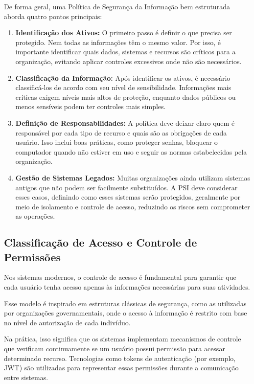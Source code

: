 \documentclass[12pt,a4paper,twoside]{report}
\begin{document}
De forma geral, uma Política de Segurança da Informação bem estruturada aborda quatro pontos principais:

\begin{enumerate}
    \item \textbf{Identificação dos Ativos:} O primeiro passo é definir o que precisa ser protegido. Nem todas as informações têm o mesmo valor. Por isso, é importante identificar quais dados, sistemas e recursos são críticos para a organização, evitando aplicar controles excessivos onde não são necessários.

    \item \textbf{Classificação da Informação:} Após identificar os ativos, é necessário classificá-los de acordo com seu nível de sensibilidade. Informações mais críticas exigem níveis mais altos de proteção, enquanto dados públicos ou menos sensíveis podem ter controles mais simples.

    \item \textbf{Definição de Responsabilidades:} A política deve deixar claro quem é responsável por cada tipo de recurso e quais são as obrigações de cada usuário. Isso inclui boas práticas, como proteger senhas, bloquear o computador quando não estiver em uso e seguir as normas estabelecidas pela organização.

    \item \textbf{Gestão de Sistemas Legados:} Muitas organizações ainda utilizam sistemas antigos que não podem ser facilmente substituídos. A PSI deve considerar esses casos, definindo como esses sistemas serão protegidos, geralmente por meio de isolamento e controle de acesso, reduzindo os riscos sem comprometer as operações.
\end{enumerate}

\subsection{Classificação de Acesso e Controle de Permissões}

Nos sistemas modernos, o controle de acesso é fundamental para garantir que cada usuário tenha acesso apenas às informações necessárias para suas atividades.

Esse modelo é inspirado em estruturas clássicas de segurança, como as utilizadas por organizações governamentais, onde o acesso à informação é restrito com base no nível de autorização de cada indivíduo.

Na prática, isso significa que os sistemas implementam mecanismos de controle que verificam continuamente se um usuário possui permissão para acessar determinado recurso. Tecnologias como tokens de autenticação (por exemplo, JWT) são utilizadas para representar essas permissões durante a comunicação entre sistemas.
\end{document}
